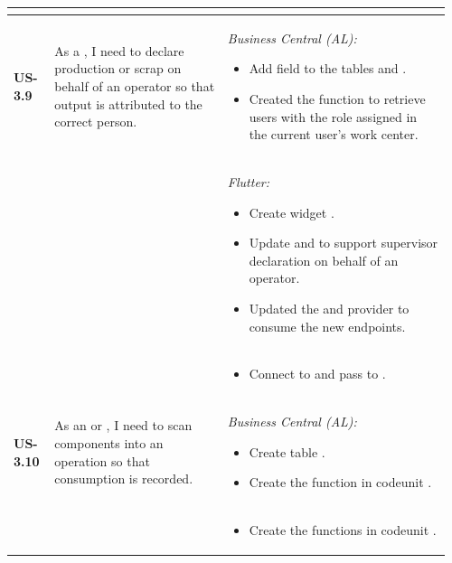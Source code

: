 \begin{longtable}{@{} P{0.09\linewidth} P{0.38\linewidth} P{0.49\linewidth} @{}}
\begin{itemize}[nosep, leftmargin=*]
	\end{itemize}\\
	\midrule
	\textbf{US-3.9}
	& As a , I need to declare production or scrap on behalf of an
	operator so that output is attributed to the correct person.
	& \noindent\textit{Business Central (AL):}
	\begin{itemize}[nosep, leftmargin=*]
		\item Add field  to the tables  and .
		\item Created the function  to retrieve users with the  role assigned in the current user's work center.
	\end{itemize}
\\ & &
	\noindent\textit{Flutter:}
	\begin{itemize}[nosep, leftmargin=*]
		\item Create widget .
		\item Update  and  to support supervisor declaration on behalf of an operator.
		\item Updated the  and provider to consume the new endpoints.
	\end{itemize} \\ & &
	\begin{itemize}[nosep, leftmargin=*]
		\item Connect  to  and pass  to .
	\end{itemize} \\
	\midrule
	\textbf{US-3.10}
	& As an  or , I need to scan
	components into an operation so that consumption is recorded.
	& \noindent\textit{Business Central (AL):}
	\begin{itemize}[nosep, leftmargin=*]
		\item Create table .
		\item Create the function  in codeunit .
	\end{itemize} \\ & &
	\begin{itemize}[nosep, leftmargin=*]
		\item Create the functions   in codeunit .

\end{itemize}
\end{longtable}
